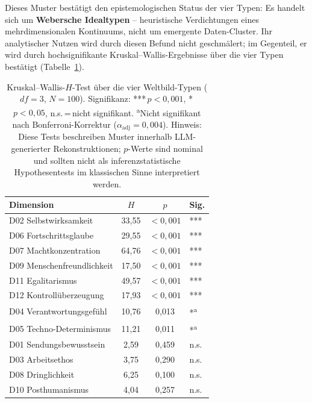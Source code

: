 \documentclass[12pt,a4paper]{article}
\begin{document}
Dieses Muster bestätigt den epistemologischen Status der vier Typen: Es handelt sich um \textbf{Webersche Idealtypen} -- heuristische Verdichtungen eines mehrdimensionalen Kontinuums, nicht um emergente Daten-Cluster. Ihr analytischer Nutzen wird durch diesen Befund nicht geschmälert; im Gegenteil, er wird durch hochsignifikante Kruskal--Wallis-Ergebnisse über die vier Typen bestätigt (Tabelle~\ref{tab:kruskal}).

\begin{table}[htbp]
  \centering
  \caption{Kruskal--Wallis-$H$-Test über die vier Weltbild-Typen ($df = 3$, $N = 100$). Signifikanz: {*}{*}{*}\,$p < 0{,}001$, {*}\,$p < 0{,}05$, n.s.\,=\,nicht signifikant. \textsuperscript{a}Nicht signifikant nach Bonferroni-Korrektur ($\alpha_{\mathrm{adj}} = 0{,}004$). Hinweis: Diese Tests beschreiben Muster innerhalb LLM-generierter Rekonstruktionen; $p$-Werte sind nominal und sollten nicht als inferenzstatistische Hypothesentests im klassischen Sinne interpretiert werden.}
  \label{tab:kruskal}
  \footnotesize
  \begin{tabular}{l c c l}
    \toprule
    \textbf{Dimension} & $H$ & $p$ & \textbf{Sig.} \\
    \midrule
    D02 Selbstwirksamkeit & 33,55 & $< 0{,}001$ & {*}{*}{*} \\
    D06 Fortschrittsglaube & 29,55 & $< 0{,}001$ & {*}{*}{*} \\
    D07 Machtkonzentration & 64,76 & $< 0{,}001$ & {*}{*}{*} \\
    D09 Menschenfreundlichkeit & 17,50 & $< 0{,}001$ & {*}{*}{*} \\
    D11 Egalitarismus & 49,57 & $< 0{,}001$ & {*}{*}{*} \\
    D12 Kontrollüberzeugung & 17,93 & $< 0{,}001$ & {*}{*}{*} \\
    \midrule
    D04 Verantwortungsgefühl & 10,76 & 0,013 & {*}\textsuperscript{a} \\
    D05 Techno-Determinismus & 11,21 & 0,011 & {*}\textsuperscript{a} \\
    \midrule
    D01 Sendungsbewusstsein & 2,59 & 0,459 & n.s. \\
    D03 Arbeitsethos & 3,75 & 0,290 & n.s. \\
    D08 Dringlichkeit & 6,25 & 0,100 & n.s. \\
    D10 Posthumanismus & 4,04 & 0,257 & n.s. \\
    \bottomrule
  \end{tabular}
\end{table}
\end{document}
